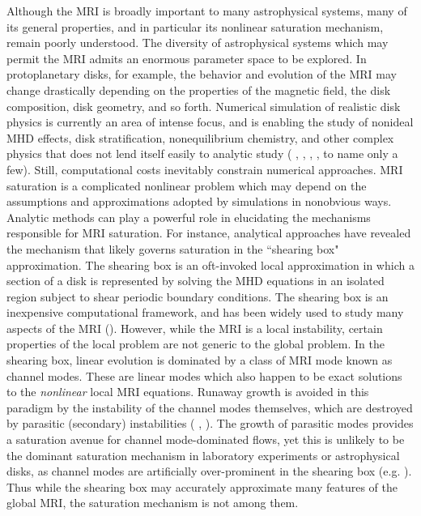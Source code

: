 \documentclass{emulateapj}
\newcommand{\citei}[1]{\citeauthor{#1} \citeyear{#1}}
\begin{document}



Although the MRI is broadly important to many astrophysical systems, many of its general properties, and in particular its nonlinear saturation mechanism, remain poorly understood. The diversity of astrophysical systems which may permit the MRI admits an enormous parameter space to be explored. In protoplanetary disks, for example, the behavior and evolution of the MRI may change drastically depending on the properties of the magnetic field, the disk composition, disk geometry, and so forth. Numerical simulation of realistic disk physics is currently an area of intense focus, and is enabling the study of nonideal MHD effects, disk stratification, nonequilibrium chemistry, and other complex physics that does not lend itself easily to analytic study (\citei{Fleming:2003fs}, \citei{Bai:2011cm}, \citei{Flock:2013}, \citei{Suzuki:2014vh}, to name only a few). Still, computational costs inevitably constrain numerical approaches. MRI saturation is a complicated nonlinear problem which may depend on the assumptions and approximations adopted by simulations in nonobvious ways. Analytic methods can play a powerful role in elucidating the mechanisms responsible for MRI saturation. For instance, analytical approaches have revealed the mechanism that likely governs saturation in the ``shearing box" approximation. The shearing box is an oft-invoked local approximation in which a section of a disk is represented by solving the MHD equations in an isolated region subject to shear periodic boundary conditions. The shearing box is an inexpensive computational framework, and has been widely used to study many aspects of the MRI (). However, while the MRI is a local instability, certain properties of the local problem are not generic to the global problem. In the shearing box, linear evolution is dominated by a class of MRI mode known as channel modes. These are linear modes which also happen to be exact solutions to the \textit{nonlinear} local MRI equations. Runaway growth is avoided in this paradigm by the instability of the channel modes themselves, which are destroyed by parasitic (secondary) instabilities (\citei{Goodman:1994ul}, \citei{Pessah:2010ic}). The growth of parasitic modes provides a saturation avenue for channel mode-dominated flows, yet this is unlikely to be the dominant saturation mechanism in laboratory experiments or astrophysical disks, as channel modes are artificially over-prominent in the shearing box (e.g. \citei{Latter:2015}). Thus while the shearing box may accurately approximate many features of the global MRI, the saturation mechanism is not among them. 
\end{document}
